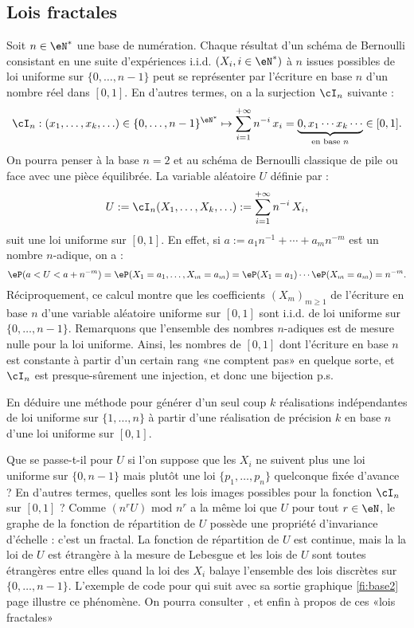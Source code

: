 %
\subsection{Lois fractales}
\label{ss:lois-fractales}
%

Soit $n\in\eN^*$ une base de numération.  Chaque résultat d'un schéma de
Bernoulli consistant en une suite d'expériences i.i.d. $(X_i,i\in\eN^*)$ à $n$
issues possibles de loi uniforme sur $\{0,\ldots,n-1\}$ peut se représenter
par l'écriture en base $n$ d'un nombre réel dans $[0,1]$. En d'autres termes,
on a la surjection $\cI_n$ suivante :
$$
\cI_n: (x_1,\ldots,x_k,\ldots)\in\{0,\ldots,n-1\}^{\eN^*} 
\mapsto \sum_{i=1}^{+\infty} n^{-i}\,x_i 
= \underbrace{0,x_1\cdots x_k\cdots}_{\text{en base }n} \in [0,1].
$$
On pourra penser à la base $n=2$ et au schéma de Bernoulli classique de pile ou face
avec une pièce équilibrée. La variable aléatoire $U$ définie par :
$$
U:=\cI_n(X_1,\ldots,X_k,\ldots):=\sum_{i=1}^{+\infty} n^{-i}\,X_i,
$$
suit une loi uniforme sur $[0,1]$.  
En effet, si $a:=a_1 n^{-1}+\cdots+a_m n^{-m}$ est un nombre $n$-adique, on a :
$$
\eP( a < U < a+n^{-m})
=
\eP( X_1 = a_1,\ldots,X_m=a_m)
=
\eP( X_1 = a_1) \cdots \eP(X_m=a_m)
=
n^{-m}.
$$
Réciproquement, ce calcul montre que les coefficients $(X_m)_{m\geq 1}$ de
l'écriture en base $n$ d'une variable aléatoire uniforme sur $[0,1]$ sont
i.i.d. de loi uniforme sur $\{0,\ldots,n-1\}$. Remarquons que l'ensemble des
nombres $n$-adiques est de mesure nulle pour la loi uniforme. Ainsi, les
nombres de $[0,1]$ dont l'écriture en base $n$ est constante à partir d'un
certain rang «ne comptent pas» en quelque sorte, et $\cI_n$ est
presque-sûrement une injection, et donc une bijection p.s.

\begin{exo}
  En déduire une méthode pour générer d'un seul coup $k$ réalisations
  indépendantes de loi uniforme sur $\{1,\ldots,n\}$ à partir d'une
  réalisation de précision $k$ en base $n$ d'une loi uniforme sur $[0,1]$.
\end{exo}

Que se passe-t-il pour $U$ si l'on suppose que les $X_i$ ne suivent plus une
loi uniforme sur $\{0,n-1\}$ mais plutôt une loi $\{p_1,\ldots,p_n\}$ quelconque fixée
d'avance ? En d'autres termes, quelles sont les lois images possibles pour la
fonction $\cI_n$ sur $[0,1]$ ?  Comme $(n^rU)\text{ mod } n^r$ a la même loi
que $U$ pour tout $r\in\eN$, le graphe de la fonction de répartition de $U$
possède une propriété d'invariance d'échelle : c'est un fractal. La fonction
de répartition de $U$ est continue, mais la la loi de $U$ est étrangère à la
mesure de Lebesgue et les lois de $U$ sont toutes étrangères entre elles quand
la loi des $X_i$ balaye l'ensemble des lois discrètes sur $\{0,\ldots,n-1\}$.
L'exemple de code pour \OC{} qui suit avec sa sortie graphique \ref{fi:base2}
page \pageref{fi:base2} illustre ce phénomène. On pourra consulter \cite[exe.
3.3.15 page 81]{dacunha-castelle-duflo}, \cite[expl. IV.3.6.iii pages 100-103
et V.5.3 page 144]{barbe-ledoux} et enfin \cite[exe. V.6.15 page
155]{barbe-ledoux} à propos de ces «lois fractales»


